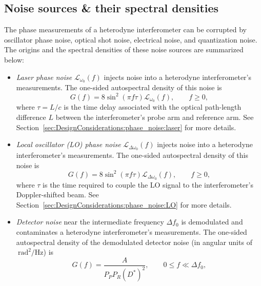 \subsection{Noise sources \& their spectral densities}
The phase measurements of a heterodyne interferometer can be corrupted by
oscillator phase noise, optical shot noise, electrical noise, and
quantization noise.
The origins and the spectral densities of these noise sources
are summarized below:
\begin{itemize}
  \item \emph{Laser phase noise}
    $\mathcal{L}_{\omega_0}(f)$
    injects noise into a heterodyne interferometer's measurements.
    The one-sided autospectral density of this noise is
    \begin{equation}
      G(f)
      =
      8 \sin^2(\pi f \tau) \mathcal{L}_{\omega_0}(f),
      \qquad
      f \geq 0,
      \label{eq:DesignConsiderations:summary:laser_phase_noise_autospectral_density}
    \end{equation}
    where $\tau = L / c$ is the time delay
    associated with the optical path-length difference $L$
    between the interferometer's probe arm and reference arm.
    See Section~\ref{sec:DesignConsiderations:phase_noise:laser}
    for more details.
  \item \emph{Local oscillator (LO) phase noise}
    $\mathcal{L}_{\Delta \omega_0}(f)$
    injects noise into a heterodyne interferometer's measurements.
    The one-sided autospectral density of this noise is
    \begin{equation}
      G(f)
      =
      8 \sin^2(\pi f \tau) \mathcal{L}_{\Delta \omega_0}(f),
      \qquad
      f \geq 0,
      \label{eq:DesignConsiderations:summary:LO_phase_noise_autospectral_density}
    \end{equation}
    where $\tau$ is the time required to couple the LO signal
    to the interferometer's Doppler-shifted beam.
    See Section~\ref{sec:DesignConsiderations:phase_noise:LO}
    for more details.
  \item \emph{Detector noise} near the intermediate frequency $\Delta f_0$
    is demodulated and contaminates a heterodyne interferometer's measurements.
    The one-sided autospectral density of the demodulated detector noise
    (in angular units of $\SI{}{\radian\squared\per\Hz}$) is
    \begin{equation}
      G(f)
      =
      \frac{A}{P_P P_R (D^*)^2},
      \qquad
      0 \leq f \ll \Delta f_0,
      \label{eq:DesignConsiderations:summary:detector_noise_autospectral_density}

\end{equation}
\end{itemize}
